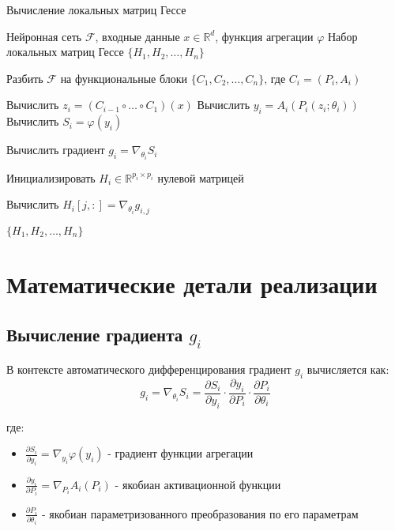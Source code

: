 \documentclass[12pt]{article}
\begin{document}
\begin{algorithm}
\caption{Вычисление локальных матриц Гессе}
\begin{algorithmic}[1]
\Require Нейронная сеть $\mathcal{F}$, входные данные $x \in \mathbb{R}^d$, функция агрегации $\varphi$
\Ensure Набор локальных матриц Гессе $\{H_1, H_2, \ldots, H_n\}$

\State Разбить $\mathcal{F}$ на функциональные блоки $\{C_1, C_2, \ldots, C_n\}$, где $C_i = (P_i, A_i)$

    \State Вычислить $z_i = (C_{i-1} \circ \ldots \circ C_1)(x)$ 
    \State Вычислить $y_i = A_i(P_i(z_i; \theta_i))$ 
    \State Вычислить $S_i = \varphi(y_i)$ 
    
    \State Вычислить градиент $g_i = \nabla_{\theta_i} S_i$
    
    \State Инициализировать $H_i \in \mathbb{R}^{p_i \times p_i}$ нулевой матрицей
    
            \State Вычислить $H_i[j,:] = \nabla_{\theta_i} g_{i,j}$
        \EndIf
    \EndFor
\EndFor

\State \Return $\{H_1, H_2, \ldots, H_n\}$
\end{algorithmic}
\end{algorithm}

\section{Математические детали реализации}

\subsection{Вычисление градиента $g_i$}
В контексте автоматического дифференцирования градиент $g_i$ вычисляется как:
\begin{equation}
g_i = \nabla_{\theta_i} S_i = \frac{\partial S_i}{\partial y_i} \cdot \frac{\partial y_i}{\partial P_i} \cdot \frac{\partial P_i}{\partial \theta_i}
\end{equation}

где:
\begin{itemize}
\item $\frac{\partial S_i}{\partial y_i} = \nabla_{y_i} \varphi(y_i)$ - градиент функции агрегации
\item $\frac{\partial y_i}{\partial P_i} = \nabla_{P_i} A_i(P_i)$ - якобиан активационной функции
\item $\frac{\partial P_i}{\partial \theta_i}$ - якобиан параметризованного преобразования по его параметрам
\end{itemize}
\end{document}
